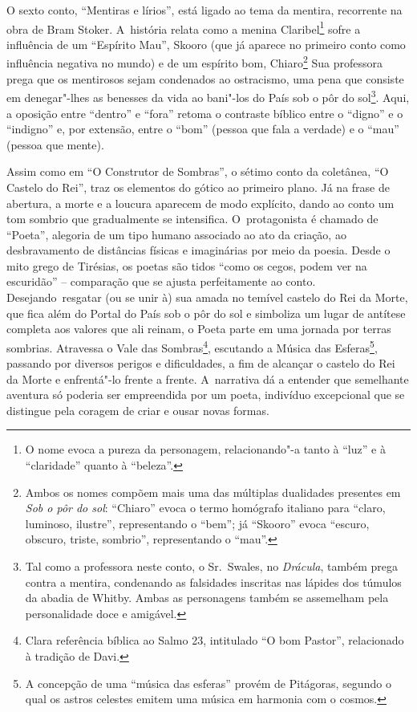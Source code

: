 O sexto conto, ``Mentiras e lírios'', está ligado ao tema da mentira,
recorrente na obra de Bram Stoker. A~história relata como a menina
Claribel\footnote{O nome evoca a pureza da personagem,
relacionando"-a tanto à ``luz'' e à ``claridade'' quanto à ``beleza''.} sofre a influência de um ``Espírito
Mau'', Skooro (que já aparece no primeiro conto como influência negativa
no mundo) e de um espírito bom, Chiaro\footnote{Ambos os nomes compõem mais uma das
múltiplas dualidades presentes em \emph{Sob o pôr do sol}: ``Chiaro''
evoca o termo homógrafo italiano para ``claro, luminoso, ilustre'',
representando o ``bem''; já ``Skooro'' evoca ``escuro, obscuro, triste,
sombrio'', representando o ``mau''.}
Sua professora prega que os mentirosos sejam condenados ao ostracismo, uma
pena que consiste em denegar"-lhes as benesses da vida ao bani"-los do
País sob o pôr do sol\footnote{Tal como a professora neste conto, o Sr.~Swales, no \emph{Drácula}, também prega contra a mentira, condenando as
falsidades inscritas nas lápides dos túmulos da abadia de Whitby. Ambas
as personagens também se assemelham pela personalidade doce e amigável.}. Aqui, a oposição entre
``dentro'' e ``fora'' retoma o contraste bíblico entre o ``digno'' e o
``indigno'' e, por extensão, entre o ``bom'' (pessoa que fala a verdade)
e o ``mau'' (pessoa que mente).

Assim como em ``O Construtor de Sombras'', o sétimo conto da coletânea,
``O Castelo do Rei'', traz os elementos do gótico ao primeiro plano. Já
na frase de abertura, a morte e a loucura aparecem de modo explícito,
dando ao conto um tom sombrio que gradualmente se intensifica. O~protagonista é chamado de ``Poeta'', alegoria de um tipo humano
associado ao ato da criação, ao desbravamento de distâncias físicas e
imaginárias por meio da poesia. Desde o mito grego de Tirésias, os
poetas são tidos ``como os cegos, podem ver na escuridão'' -- comparação
que se ajusta perfeitamente ao conto. Desejando~resgatar (ou se unir à)
sua amada no temível castelo do Rei da Morte, que fica além do Portal do
País sob o pôr do sol e simboliza um lugar de antítese completa aos
valores que ali reinam, o Poeta parte em uma jornada por terras
sombrias. Atravessa o Vale das Sombras\footnote{Clara referência bíblica ao Salmo 23,
intitulado ``O bom Pastor'', relacionado à tradição de Davi.
},
escutando a Música das Esferas\footnote{A concepção de uma ``música das esferas''
provém de Pitágoras, segundo o qual os astros celestes emitem uma música
em harmonia com o cosmos.}, passando por
diversos perigos e dificuldades, a fim de alcançar o castelo do Rei da
Morte e enfrentá"-lo frente a frente. A~narrativa dá a entender que
semelhante aventura só poderia ser empreendida por um poeta, indivíduo
excepcional que se distingue pela coragem de criar e ousar novas formas.

